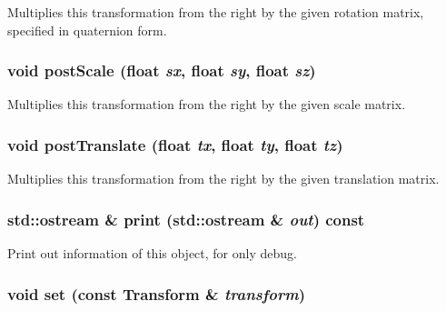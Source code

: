 Multiplies this transformation from the right by the given rotation matrix, specified in quaternion form. \hypertarget{classm3g_1_1Transform_4cbb4aa3878b658da54a144896f71446}{
\subsubsection[{postScale}]{\setlength{\rightskip}{0pt plus 5cm}void postScale (float {\em sx}, \/  float {\em sy}, \/  float {\em sz})}}
\label{classm3g_1_1Transform_4cbb4aa3878b658da54a144896f71446}


Multiplies this transformation from the right by the given scale matrix. \hypertarget{classm3g_1_1Transform_638498b811d6ccdf60b7f1f3de157ed6}{
\subsubsection[{postTranslate}]{\setlength{\rightskip}{0pt plus 5cm}void postTranslate (float {\em tx}, \/  float {\em ty}, \/  float {\em tz})}}
\label{classm3g_1_1Transform_638498b811d6ccdf60b7f1f3de157ed6}


Multiplies this transformation from the right by the given translation matrix. \hypertarget{classm3g_1_1Transform_6fea17fa1532df3794f8cb39cb4f911f}{
\subsubsection[{print}]{\setlength{\rightskip}{0pt plus 5cm}std::ostream \& print (std::ostream \& {\em out}) const}}
\label{classm3g_1_1Transform_6fea17fa1532df3794f8cb39cb4f911f}


Print out information of this object, for only debug. \hypertarget{classm3g_1_1Transform_8926ff19517a76de8f938025e9d3163d}{
\subsubsection[{set}]{\setlength{\rightskip}{0pt plus 5cm}void set (const {\bf Transform} \& {\em transform})}}
\label{classm3g_1_1Transform_8926ff19517a76de8f938025e9d3163d}


